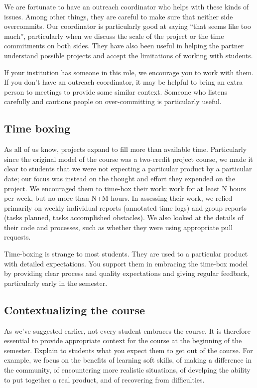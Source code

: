 We are fortunate to have an outreach coordinator who helps with these kinds
of issues.  Among other things, they are careful to make sure that neither
side overcommits.  Our coordinator is particularly good at saying ``that
seems like too much'', particularly when we discuss the scale of the project
or the time commitments on both sides.  They have also been useful in
helping the partner understand possible projects and accept the limitations
of working with students.

If your institution has someone in this role, we encourage you to work with
them.  If you don't have an outreach coordinator, it may be helpful to
bring an extra person to meetings to provide some similar context.  Someone
who listens carefully and cautions people on over-committing is particularly
useful.

\subsection{Time boxing}

As all of us know, projects expand to fill more than available time.
Particularly since the original model of the course was a two-credit
project course, we made it clear to students that we were not expecting
a particular product by a particular date; our focus was instead on the
thought and effort they expended on the project.  We encouraged them
to time-box their work: work for at least N hours per week, but no more
than N+M hours.  In assessing their work, we relied primarily on
weekly individual reports (annotated time logs) and group reports
(tasks planned, tasks accomplished obstacles).  We also looked at the
details of their code and processes, such as whether they were using
appropriate pull requests.

Time-boxing is strange to most students.  They are used to a particular
product with detailed expectations.  You support them in embracing the
time-box model by providing clear process and quality expectations and
giving regular feedback, particularly early in the semester.

\subsection{Contextualizing the course}

As we've suggested earlier, not every student embraces the course.  It
is therefore essential to provide appropriate context for the course at
the beginning of the semester.  Explain to students what you expect them
to get out of the course.  For example, we focus on the benefits of learning
soft skills, of making a difference in the community, of encountering
more realistic situations, of develping the ability to put together a
real product, and of recovering from difficulties.
